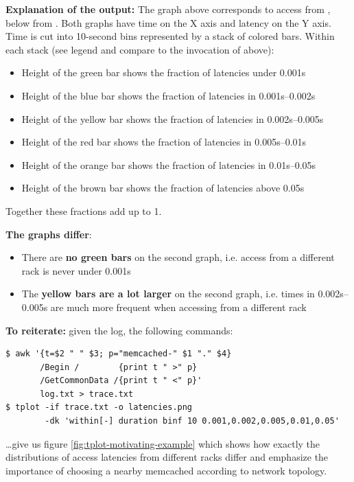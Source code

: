 \documentclass{article}
\begin{document}
\textbf{Explanation of the output:} The graph above corresponds to access from , below from . Both graphs have time on the X axis and latency on the Y axis. Time is cut into 10-second bins represented by a stack of colored bars. Within each stack (see legend and compare to the invocation of  above):
\begin{itemize}
\item Height of the green bar shows the fraction of latencies under 0.001s
\item Height of the blue bar shows the fraction of latencies in 0.001s--0.002s
\item Height of the yellow bar shows the fraction of latencies in 0.002s--0.005s
\item Height of the red bar shows the fraction of latencies in 0.005s--0.01s
\item Height of the orange bar shows the fraction of latencies in 0.01s--0.05s
\item Height of the brown bar shows the fraction of latencies above 0.05s
\end{itemize}

Together these fractions add up to 1.

\textbf{The graphs differ}:
\begin{itemize}
\item There are \textbf{no green bars} on the second graph, i.e. access from a different rack is never under 0.001s
\item The \textbf{yellow bars are a lot larger} on the second graph, i.e. times in 0.002s--0.005s are much more frequent when accessing from a different rack
\end{itemize}

\textbf{To reiterate:} given the log, the following commands:

\begin{verbatim}
$ awk '{t=$2 " " $3; p="memcached-" $1 "." $4}
       /Begin /        {print t " >" p} 
       /GetCommonData /{print t " <" p}'
       log.txt > trace.txt
$ tplot -if trace.txt -o latencies.png
        -dk 'within[-] duration binf 10 0.001,0.002,0.005,0.01,0.05'
\end{verbatim}

\ldots give us figure \ref{fig:tplot-motivating-example} which shows how exactly the distributions of access latencies from different racks differ and emphasize the importance of choosing a nearby memcached according to network topology.
\end{document}
